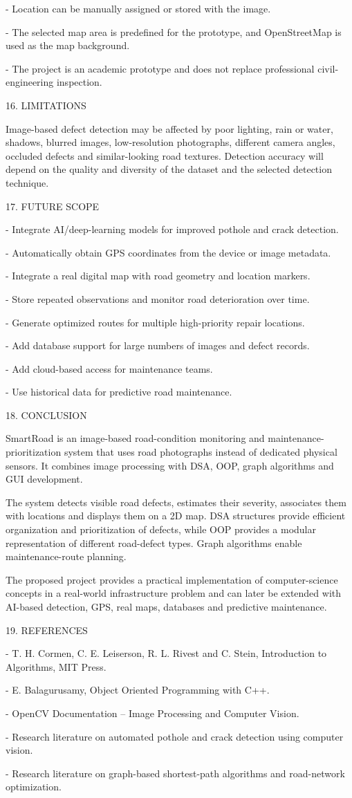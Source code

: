 \documentclass[
]{article}
\begin{document}
- Location can be manually assigned or stored with the image.

- The selected map area is predefined for the prototype, and
OpenStreetMap is used as the map background.

- The project is an academic prototype and does not replace professional
civil-engineering inspection.

16. LIMITATIONS

Image-based defect detection may be affected by poor lighting, rain or
water, shadows, blurred images, low-resolution photographs, different
camera angles, occluded defects and similar-looking road textures.
Detection accuracy will depend on the quality and diversity of the
dataset and the selected detection technique.

17. FUTURE SCOPE

- Integrate AI/deep-learning models for improved pothole and crack
detection.

- Automatically obtain GPS coordinates from the device or image
metadata.

- Integrate a real digital map with road geometry and location markers.

- Store repeated observations and monitor road deterioration over time.

- Generate optimized routes for multiple high-priority repair locations.

- Add database support for large numbers of images and defect records.

- Add cloud-based access for maintenance teams.

- Use historical data for predictive road maintenance.

18. CONCLUSION

SmartRoad is an image-based road-condition monitoring and
maintenance-prioritization system that uses road photographs instead of
dedicated physical sensors. It combines image processing with DSA, OOP,
graph algorithms and GUI development.

The system detects visible road defects, estimates their severity,
associates them with locations and displays them on a 2D map. DSA
structures provide efficient organization and prioritization of defects,
while OOP provides a modular representation of different road-defect
types. Graph algorithms enable maintenance-route planning.

The proposed project provides a practical implementation of
computer-science concepts in a real-world infrastructure problem and can
later be extended with AI-based detection, GPS, real maps, databases and
predictive maintenance.

19. REFERENCES

- T. H. Cormen, C. E. Leiserson, R. L. Rivest and C. Stein, Introduction
to Algorithms, MIT Press.

- E. Balagurusamy, Object Oriented Programming with C++.

- OpenCV Documentation -- Image Processing and Computer Vision.

- Research literature on automated pothole and crack detection using
computer vision.

- Research literature on graph-based shortest-path algorithms and
road-network optimization.
\end{document}
